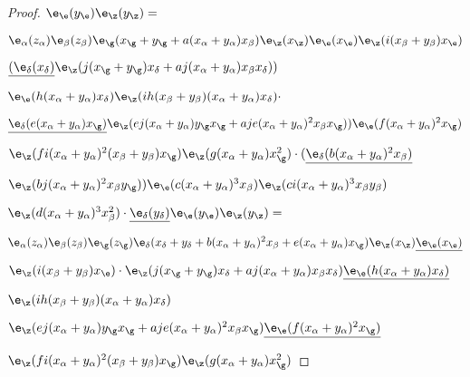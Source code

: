 \documentclass{memo-l}
\theoremstyle{definition}
\theoremstyle{remark}
\numberwithin{section}{chapter}
\numberwithin{equation}{chapter}
\begin{document}
\begin{proof}
${\e}_{{\e}}(y_{{\e}}){\e}_{{\z}}(y_{{\z}}) = $

\medpagebreak

$\e_\alpha(z_\alpha)\e_\beta(z_\beta)
{\e}_{{\g}}({ x_{{\g}}+y_{{\g}}+a(x_{\alpha}+
y_{\alpha})x_{\beta}}){\e}_{{\z}}(x_{{\z}})
{\e}_{{\e}}(x_{{\e}}){\e}_{{\z}}(i(x_{\beta}+
y_{\beta})x_{{\e}})$

${\underline{({\e}_{{\delta}}
(x_{\delta})}}{\e}_{{\z}}(j(x_{{\g}}+y_{{\g}})x_{{\delta}}+aj(x_{\alpha}+
y_{\alpha})x_{\beta}x_{{\delta}}){ )}$

${\e}_{{\e}}
(h(x_{\alpha}+y_{\alpha})x_{{\delta}}){\e}_{{\z}}(ih(x_{\beta}+
y_{\beta})(x_{\alpha}+y_{\alpha})x_{\delta})\cdot$

${\underline{{\e}_{{\delta}}(e(x_{\alpha}+y_{\alpha})x_{{\g}})}}
{\e}_{{\z}}(ej(x_{\alpha}+y_{\alpha})y_{{\g}}x_{{\g}}+
aje(x_{\alpha}+y_{\alpha})^{2}x_{\beta}x_{{\g}}){ )}
{\e}_{{\e}}(f(x_{\alpha}+y_{\alpha})^{2}x_{{\g}})$

${\e}_{{\z}}(fi(x_{\alpha}+y_{\alpha})^{2}(x_{\beta}+
y_{\beta})x_{{\g}}){\e}_{{\z}}(g(x_{\alpha}+y_{\alpha})
x_{{\g}}^{2})\cdot ({\underline{{\e}_{{\delta}}(b(x_{\alpha}
+y_{\alpha}) ^{2} x_{\beta})}}$


${\e}_{{\z}}(bj(x_{\alpha}+y_{\alpha})^{2}x_{\beta}y_{{\g}})
{ )}{\e}_{{\e}}(c(x_{\alpha}+y_{\alpha})^{3}x_{\beta})
{\e}_{{\z}}(ci(x_{\alpha}+y_{\alpha})^{3}x_{\beta}y_{\beta})$


${\e}_{{\z}}(d(x_{\alpha}+y_{\alpha})^{3}x_{\beta}^{2}) \cdot
{\underline{{\e}_{{\delta}}(y_{{\delta}})}} {\e}_{{\e}}
(y_{{\e}}){\e}_{{\z}}(y_{{\z}}) =$

\medpagebreak


$\e_\alpha(z_{\alpha})\e_\beta(z_\beta)
\e_\g(z_\g)\e_\delta( x_\delta+y_\delta+b(x_\alpha+y_\alpha)^2x_\beta+e(x_\alpha+
y_\alpha)x_\g)\e_\z(x_\z)
{\underline{\e_\e(x_\e)}}$



${\e}_{{\z}}(i(x_{\beta}+y_{\beta})x_{{\e}})\cdot
{\e}_{{\z}}(j(x_{{\g}}+y_{{\g}})x_{{\delta}}+
aj(x_{\alpha}+y_{\alpha})x_{\beta}x_{{\delta}})
{\underline{{\e}_{{\e}}(h(x_{\alpha}+
y_{\alpha})x_{{\delta}})}}$

${\e}_{{\z}}(ih(x_{\beta}+y_{\beta})(x_{\alpha}+y_{\alpha})
x_{{\delta}})$

${\e}_{{\z}}(ej(x_{\alpha}+y_{\alpha})
y_{{\g}}x_{{\g}}+aje(x_{\alpha}+y_{\alpha})^{2}x_{\beta}
x_\g){\underline{\e_{{\e}}(f(x_{\alpha}+
y_\alpha)^2 x_\g)}}$

${\e}_{{\z}}(fi(x_{\alpha}+y_{\alpha})^{2}(x_{\beta}+
y_{\beta})x_{{\g}}){\e}_{{\z}}(g(x_{\alpha}+y_{\alpha})
x_{{\g}}^{2})$


\end{proof}
\end{document}
